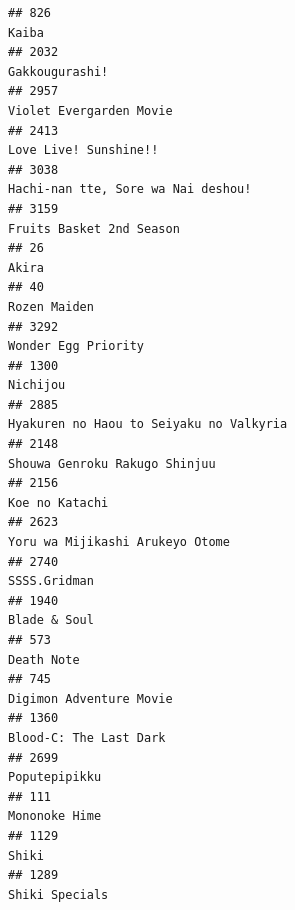 \documentclass[
]{article}
\begin{document}
\begin{verbatim}
## 826                                                                                                      Kaiba
## 2032                                                                                            Gakkougurashi!
## 2957                                                                                   Violet Evergarden Movie
## 2413                                                                                     Love Live! Sunshine!!
## 3038                                                                        Hachi-nan tte, Sore wa Nai deshou!
## 3159                                                                                  Fruits Basket 2nd Season
## 26                                                                                                       Akira
## 40                                                                                                Rozen Maiden
## 3292                                                                                       Wonder Egg Priority
## 1300                                                                                                  Nichijou
## 2885                                                                   Hyakuren no Haou to Seiyaku no Valkyria
## 2148                                                                             Shouwa Genroku Rakugo Shinjuu
## 2156                                                                                            Koe no Katachi
## 2623                                                                           Yoru wa Mijikashi Arukeyo Otome
## 2740                                                                                              SSSS.Gridman
## 1940                                                                                              Blade & Soul
## 573                                                                                                 Death Note
## 745                                                                                    Digimon Adventure Movie
## 1360                                                                                    Blood-C: The Last Dark
## 2699                                                                                             Poputepipikku
## 111                                                                                              Mononoke Hime
## 1129                                                                                                     Shiki
## 1289                                                                                            Shiki Specials

\end{verbatim}
\end{document}
